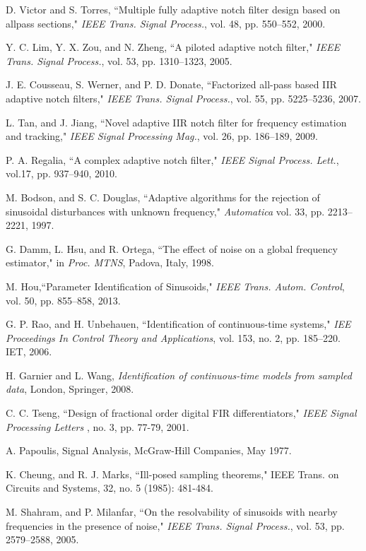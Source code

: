 \documentclass{UCF_ETD}
\begin{document}
\begin{thebibliography}{99}
D. Victor and S. Torres, ``Multiple fully adaptive notch filter design based on allpass sections,"
\emph{IEEE Trans. Signal Process.},  vol. 48, pp. 550--552, 2000.

Y. C. Lim, Y. X. Zou, and N. Zheng, ``A piloted adaptive notch filter," \emph{IEEE Trans. Signal Process.}, vol. 53, pp. 1310--1323,  2005.

J. E. Cousseau, S. Werner, and P. D. Donate, ``Factorized all-pass based IIR adaptive notch filters,"
 \emph{IEEE Trans. Signal Process.}, vol. 55, pp. 5225--5236,  2007.

L. Tan, and J. Jiang, ``Novel adaptive IIR notch filter for frequency estimation and tracking,"  \emph{IEEE Signal Processing Mag.},  vol. 26,  pp. 186--189, 2009.

P. A. Regalia, ``A complex adaptive notch filter," \emph{IEEE Signal Process. Lett.}, vol.17, pp. 937--940,  2010.

M. Bodson, and S. C. Douglas, ``Adaptive algorithms for the rejection of sinusoidal disturbances with unknown frequency," \emph{Automatica} vol. 33, pp. 2213--2221, 1997.

G. Damm, L. Hsu, and R. Ortega, ``The effect of noise on a global frequency estimator," in \emph{Proc. MTNS}, Padova, Italy,  1998.

M. Hou,``Parameter Identification of Sinusoids," \emph{IEEE Trans. Autom. Control}, vol. 50, pp. 855--858,  2013.


G. P. Rao, and H. Unbehauen, ``Identification of continuous-time systems," \emph{IEE Proceedings In Control Theory and Applications},  vol. 153, no. 2, pp. 185--220. IET, 2006.

H. Garnier and L. Wang, \emph{Identification of continuous-time models from sampled data},  London, Springer, 2008.

C. C. Tseng,  ``Design of fractional order digital FIR differentiators," \emph{IEEE Signal Processing Letters }, no. 3, pp. 77-79, 2001.

A. Papoulis, Signal Analysis, McGraw-Hill Companies, May 1977.

K. Cheung, and R. J. Marks, ``Ill-posed sampling theorems," IEEE Trans. on Circuits and Systems, 32, no. 5 (1985): 481-484.

M. Shahram, and P. Milanfar, ``On the resolvability of sinusoids with nearby frequencies in the presence of noise," \emph{IEEE Trans. Signal Process.}, vol. 53, pp. 2579--2588, 2005.


\end{thebibliography}
\end{document}
